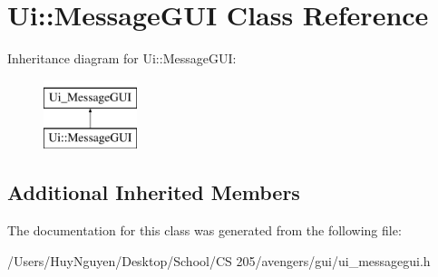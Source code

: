 \hypertarget{classUi_1_1MessageGUI}{}\section{Ui\+:\+:Message\+G\+UI Class Reference}
\label{classUi_1_1MessageGUI}
Inheritance diagram for Ui\+:\+:Message\+G\+UI\+:\begin{figure}[H]
\begin{center}
\leavevmode
\includegraphics[height=2.000000cm]{classUi_1_1MessageGUI}
\end{center}
\end{figure}
\subsection*{Additional Inherited Members}


The documentation for this class was generated from the following file\+:\begin{DoxyCompactItemize}
\item 
/\+Users/\+Huy\+Nguyen/\+Desktop/\+School/\+C\+S 205/avengers/gui/ui\+\_\+messagegui.\+h\end{DoxyCompactItemize}
